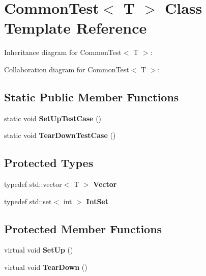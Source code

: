 \hypertarget{classCommonTest}{}\section{Common\+Test$<$ T $>$ Class Template Reference}
\label{classCommonTest}


Inheritance diagram for Common\+Test$<$ T $>$\+:


Collaboration diagram for Common\+Test$<$ T $>$\+:
\subsection*{Static Public Member Functions}
\begin{DoxyCompactItemize}
\item 
\mbox{\label{classCommonTest_a6edd90f32f45cc49e4a423b22bd770ce}} 
static void {\bfseries Set\+Up\+Test\+Case} ()
\item 
\mbox{\label{classCommonTest_a68d2bf5108cf28478331588fbdff4838}} 
static void {\bfseries Tear\+Down\+Test\+Case} ()
\end{DoxyCompactItemize}
\subsection*{Protected Types}
\begin{DoxyCompactItemize}
\item 
\mbox{\label{classCommonTest_a6dfdcede6964887b9f4254a0e0478e37}} 
typedef std\+::vector$<$ T $>$ {\bfseries Vector}
\item 
\mbox{\label{classCommonTest_a62827e9d3064cddf4a8698747f1bd434}} 
typedef std\+::set$<$ int $>$ {\bfseries Int\+Set}
\end{DoxyCompactItemize}
\subsection*{Protected Member Functions}
\begin{DoxyCompactItemize}
\item 
\mbox{\label{classCommonTest_a4c7bf7889ce48a9d06530bc4a437f3f5}} 
virtual void {\bfseries Set\+Up} ()
\item 
\mbox{\label{classCommonTest_aeae195c2cefa956c6ae5be1226e6ecd8}} 
virtual void {\bfseries Tear\+Down} ()
\end{DoxyCompactItemize}
